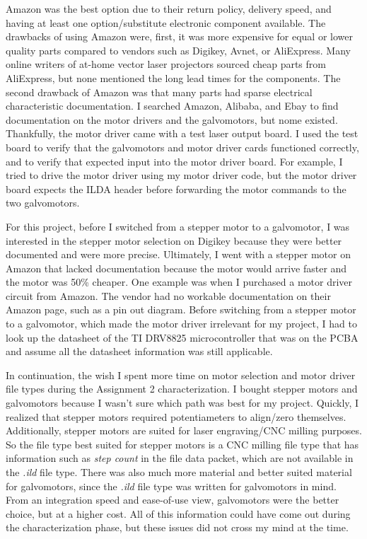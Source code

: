 \documentclass[journal]{IEEEtran}
\begin{document}
    Amazon was the best option due to their return policy, delivery speed, and having at least one option/substitute electronic component available.
    The drawbacks of using Amazon were, first, it was more expensive for equal or lower quality parts compared to vendors such as Digikey, Avnet, or AliExpress.
    Many online writers of at-home vector laser projectors sourced cheap parts from AliExpress, but none mentioned the long lead times for the components.
    The second drawback of Amazon was that many parts had sparse electrical characteristic documentation.
    I searched Amazon, Alibaba, and Ebay to find documentation on the motor drivers and the galvomotors, but nome existed.
    Thankfully, the motor driver came with a test laser output board.
    I used the test board to verify that the galvomotors and motor driver cards functioned correctly, and to verify that expected input into the motor driver board.
    For example, I tried to drive the motor driver using my motor driver code, but the motor driver board expects the ILDA header before forwarding the motor commands to the two galvomotors.

    For this project, before I switched from a stepper motor to a galvomotor, I was interested in the stepper motor selection on Digikey because they were better documented and were more precise. 
    Ultimately, I went with a stepper motor on Amazon that lacked documentation because the motor would arrive faster and the motor was 50\% cheaper. 
    One example was when I purchased a motor driver circuit from Amazon.
    The vendor had no workable documentation on their Amazon page, such as a pin out diagram.
    Before switching from a stepper motor to a galvomotor, which made the motor driver irrelevant for my project, I had to look up the datasheet of the TI DRV8825 microcontroller that was on the PCBA and assume all the datasheet information was still applicable.

    In continuation, the wish I spent more time on motor selection and motor driver file types during the Assignment 2 characterization. 
    I bought stepper motors and galvomotors because I wasn't sure which path was best for my project.  
    Quickly, I realized that stepper motors required potentiameters to align/zero themselves.
    Additionally, stepper motors are suited for laser engraving/CNC milling purposes.
    So the file type best suited for stepper motors is a CNC milling file type that has information such as \emph{step count} in the file data packet, which are not available in the \emph{.ild} file type.
    There was also much more material and better suited material for galvomotors, since the \emph{.ild} file type was written for galvomotors in mind.
    From an integration speed and ease-of-use view, galvomotors were the better choice, but at a higher cost.
    All of this information could have come out during the characterization phase, but these issues did not cross my mind at the time.
\end{document}
